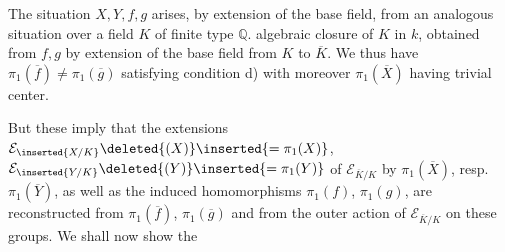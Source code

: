 
The situation $X,Y,f,g$ arises, by extension of the base field, from an analogous situation over a field $K$  of finite type  $\mathbb Q$.   algebraic closure  of $K$ in $k$,   obtained from  $f,g$ by extension of the base field from $K$ to $\overline K$. We thus have $\pi_1(\overline f)\ne\pi_1(\overline g)$ satisfying condition d) with moreover $\pi_1(\overline X)$ having trivial center.

But these  imply that the extensions $\mathcal E_{\inserted{X/K}}\deleted{(X)}\inserted{=\pi_1(X)}$, $\mathcal E_{\inserted{Y/K}}\deleted{(Y)}\inserted{=\pi_1(Y)}$ of $\mathcal E_{\overline K/K}$ by $\pi_1(\overline X)$, resp. $\pi_1(\overline Y)$, as well as the induced homomorphisms $\pi_1(f)$, $\pi_1(g)$, are reconstructed from  $\pi_1(\overline f)$, $\pi_1(\overline g)$ and from the outer action of $\mathcal E_{\overline K/K}$ on these groups. We shall now show the
